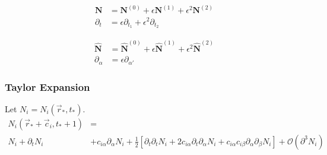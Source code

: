 \documentclass[]{article}
\begin{document}
\noindent\begin{minipage}{.5\linewidth}
  \begin{align*}
    \boldsymbol{N} &= \boldsymbol{N}^{(0)} + \epsilon \boldsymbol{N}^{(1)}+ \epsilon^2 \boldsymbol{N}^{(2)} \\
    \partial_t &= \epsilon\partial_{t_1} + \epsilon^2\partial_{t_2}
  \end{align*}
\end{minipage}
\noindent\begin{minipage}{.5\linewidth}
  \begin{align*}
      \boldsymbol{\hat{N}} &= \boldsymbol{\hat{N}}^{(0)} + \epsilon\boldsymbol{\hat{N}}^{(1)}+ \epsilon^2 \boldsymbol{\hat{N}}^{(2)} \\
      \partial_\alpha &= \epsilon\partial_{\alpha'}
  \end{align*}
\end{minipage}

\subsubsection{Taylor Expansion}
\label{subs:Taylor Expansion}
Let $N_i = N_i(\vec{r}_{*}, t_{*})$.
\begin{align*}
  N_i(\vec{r}_{*} + \vec{c}_i, t_{*} + 1) &= \\
  N_i + \partial_t N_i &+ c_{i\alpha}\partial_\alpha N_i + \frac{1}{2} [\partial_t\partial_t N_i + 2c_{i\alpha}\partial_t\partial_\alpha N_i + c_{i\alpha}c_{i\beta}\partial_\alpha\partial_\beta N_i] + \mathcal{O}(\partial^3 N_i)
\end{align*}
\end{document}
